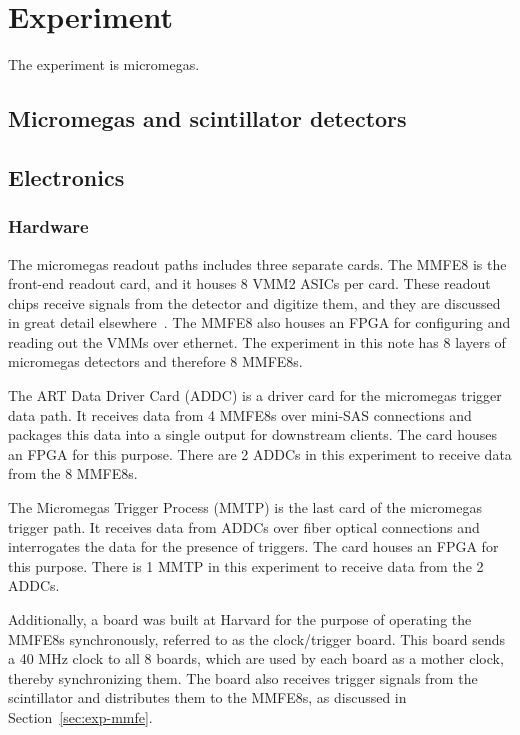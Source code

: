 \section{Experiment}
\label{sec:exp}

The experiment is micromegas.

\subsection{Micromegas and scintillator detectors}
\label{sec:exp-mm}

\subsection{Electronics}
\label{sec:exp-elx}

\subsubsection{Hardware}
\label{sec:exp-hw}

The micromegas readout paths includes three separate cards. The MMFE8 is the front-end readout card, and it houses 8 VMM2 ASICs per card. These readout chips receive signals from the detector and digitize them, and they are discussed in great detail elsewhere~\cite{nswtdr,noisy,noiseless}. The MMFE8 also houses an FPGA for configuring and reading out the VMMs over ethernet. The experiment in this note has 8 layers of micromegas detectors and therefore 8 MMFE8s.

The ART Data Driver Card (ADDC) is a driver card for the micromegas trigger data path. It receives data from 4 MMFE8s over mini-SAS connections and packages this data into a single output for downstream clients. The card houses an FPGA for this purpose. There are 2 ADDCs in this experiment to receive data from the 8 MMFE8s.

The Micromegas Trigger Process (MMTP) is the last card of the micromegas trigger path. It receives data from ADDCs over fiber optical connections and interrogates the data for the presence of triggers. The card houses an FPGA for this purpose. There is 1 MMTP in this experiment to receive data from the 2 ADDCs.

Additionally, a board was built at Harvard for the purpose of operating the MMFE8s synchronously, referred to as the clock/trigger board. This board sends a 40 MHz clock to all 8 boards, which are used by each board as a mother clock, thereby synchronizing them. The board also receives trigger signals from the scintillator and distributes them to the MMFE8s, as discussed in Section~\ref{sec:exp-mmfe}.


